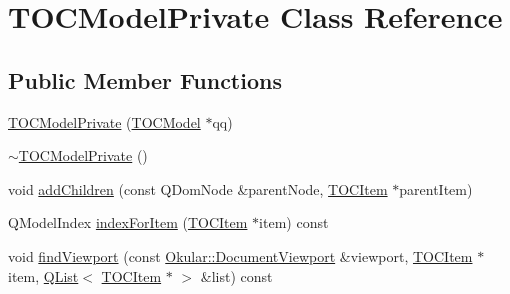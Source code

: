 \hypertarget{classTOCModelPrivate}{\section{T\+O\+C\+Model\+Private Class Reference}
\label{classTOCModelPrivate}
}
\subsection*{Public Member Functions}
\begin{DoxyCompactItemize}
\item 
\hyperlink{classTOCModelPrivate_ac61e3780b28e901f214d7d04bf4e7797}{T\+O\+C\+Model\+Private} (\hyperlink{classTOCModel}{T\+O\+C\+Model} $\ast$qq)
\item 
\hyperlink{classTOCModelPrivate_aaee85849b7554c2c758f7273d362df2e}{$\sim$\+T\+O\+C\+Model\+Private} ()
\item 
void \hyperlink{classTOCModelPrivate_a22a8c57e804e226a325adf3ff1422eeb}{add\+Children} (const Q\+Dom\+Node \&parent\+Node, \hyperlink{structTOCItem}{T\+O\+C\+Item} $\ast$parent\+Item)
\item 
Q\+Model\+Index \hyperlink{classTOCModelPrivate_a800957d9cf750f26fb145fe06c0a3cfa}{index\+For\+Item} (\hyperlink{structTOCItem}{T\+O\+C\+Item} $\ast$item) const 
\item 
void \hyperlink{classTOCModelPrivate_a95172accc02bf3fc616ee4be9fbd99f9}{find\+Viewport} (const \hyperlink{classOkular_1_1DocumentViewport}{Okular\+::\+Document\+Viewport} \&viewport, \hyperlink{structTOCItem}{T\+O\+C\+Item} $\ast$item, \hyperlink{classQList}{Q\+List}$<$ \hyperlink{structTOCItem}{T\+O\+C\+Item} $\ast$ $>$ \&list) const 
\end{DoxyCompactItemize}
